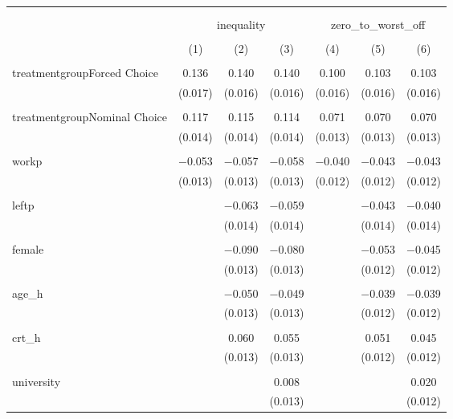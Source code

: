 
\begin{table}[!htbp] \centering 
  \caption{} 
  \label{} 
\begin{tabular}{@{\extracolsep{5pt}}lcccccc} 
\\[-1.8ex]\hline 
\hline \\[-1.8ex] 
\\[-1.8ex] & \multicolumn{3}{c}{inequality} & \multicolumn{3}{c}{zero\_to\_worst\_off} \\ 
\\[-1.8ex] & (1) & (2) & (3) & (4) & (5) & (6)\\ 
\hline \\[-1.8ex] 
 treatmentgroupForced Choice & 0.136 & 0.140 & 0.140 & 0.100 & 0.103 & 0.103 \\ 
  & (0.017) & (0.016) & (0.016) & (0.016) & (0.016) & (0.016) \\ 
  & & & & & & \\ 
 treatmentgroupNominal Choice & 0.117 & 0.115 & 0.114 & 0.071 & 0.070 & 0.070 \\ 
  & (0.014) & (0.014) & (0.014) & (0.013) & (0.013) & (0.013) \\ 
  & & & & & & \\ 
 workp & $-$0.053 & $-$0.057 & $-$0.058 & $-$0.040 & $-$0.043 & $-$0.043 \\ 
  & (0.013) & (0.013) & (0.013) & (0.012) & (0.012) & (0.012) \\ 
  & & & & & & \\ 
 leftp &  & $-$0.063 & $-$0.059 &  & $-$0.043 & $-$0.040 \\ 
  &  & (0.014) & (0.014) &  & (0.014) & (0.014) \\ 
  & & & & & & \\ 
 female &  & $-$0.090 & $-$0.080 &  & $-$0.053 & $-$0.045 \\ 
  &  & (0.013) & (0.013) &  & (0.012) & (0.012) \\ 
  & & & & & & \\ 
 age\_h &  & $-$0.050 & $-$0.049 &  & $-$0.039 & $-$0.039 \\ 
  &  & (0.013) & (0.013) &  & (0.012) & (0.012) \\ 
  & & & & & & \\ 
 crt\_h &  & 0.060 & 0.055 &  & 0.051 & 0.045 \\ 
  &  & (0.013) & (0.013) &  & (0.012) & (0.012) \\ 
  & & & & & & \\ 
 university &  &  & 0.008 &  &  & 0.020 \\ 
  &  &  & (0.013) &  &  & (0.012) \\ 

\end{tabular}
\end{table}
